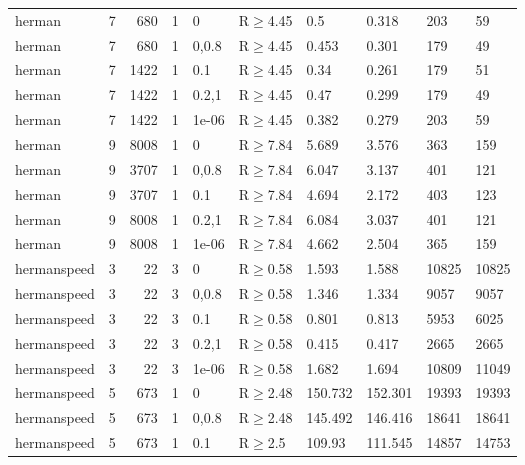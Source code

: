 \begin{longtable}{llrrllllll}
 herman        & 7        &    	680 &   1 & 0     & R$\geq$4.45  & 0.5     & 0.318    & 203    & 59     \\
 herman        & 7        &    	680 &   1 & 0,0.8 & R$\geq$4.45  & 0.453   & 0.301    & 179    & 49     \\
 herman        & 7        &   	1422 &   1 & 0.1   & R$\geq$4.45  & 0.34    & 0.261    & 179    & 51     \\
 herman        & 7        &   	1422 &   1 & 0.2,1 & R$\geq$4.45  & 0.47    & 0.299    & 179    & 49     \\
 herman        & 7        &   	1422 &   1 & 1e-06 & R$\geq$4.45  & 0.382   & 0.279    & 203    & 59     \\
 herman        & 9        &   	8008 &   1 & 0     & R$\geq$7.84  & 5.689   & 3.576    & 363    & 159    \\
 herman        & 9        &   	3707 &   1 & 0,0.8 & R$\geq$7.84  & 6.047   & 3.137    & 401    & 121    \\
 herman        & 9        &   	3707 &   1 & 0.1   & R$\geq$7.84  & 4.694   & 2.172    & 403    & 123    \\
 herman        & 9        &   	8008 &   1 & 0.2,1 & R$\geq$7.84  & 6.084   & 3.037    & 401    & 121    \\
 herman        & 9        &   	8008 &   1 & 1e-06 & R$\geq$7.84  & 4.662   & 2.504    & 365    & 159    \\
 hermanspeed   & 3        &     	22 &   3 & 0     & R$\geq$0.58  & 1.593   & 1.588    & 10825  & 10825  \\
 hermanspeed   & 3        &     	22 &   3 & 0,0.8 & R$\geq$0.58  & 1.346   & 1.334    & 9057   & 9057   \\
 hermanspeed   & 3        &     	22 &   3 & 0.1   & R$\geq$0.58  & 0.801   & 0.813    & 5953   & 6025   \\
 hermanspeed   & 3        &     	22 &   3 & 0.2,1 & R$\geq$0.58  & 0.415   & 0.417    & 2665   & 2665   \\
 hermanspeed   & 3        &     	22 &   3 & 1e-06 & R$\geq$0.58  & 1.682   & 1.694    & 10809  & 11049  \\
 hermanspeed   & 5        &    	673 &   1 & 0     & R$\geq$2.48  & 150.732 & 152.301  & 19393  & 19393  \\
 hermanspeed   & 5        &    	673 &   1 & 0,0.8 & R$\geq$2.48  & 145.492 & 146.416  & 18641  & 18641  \\
 hermanspeed   & 5        &    	673 &   1 & 0.1   & R$\geq$2.5   & 109.93  & 111.545  & 14857  & 14753  \\

\end{longtable}
